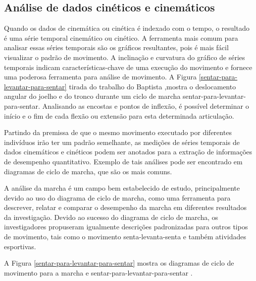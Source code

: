 \subsection{Análise de dados cinéticos e cinemáticos}
Quando os dados de cinemática ou cinética é indexado com o tempo, o resultado é uma série temporal cinemático
 ou cinético. A ferramenta mais comum para analisar essas séries temporais são os
gráficos resultantes, pois é mais fácil visualizar o padrão de movimento. A inclinação e
curvatura do gráfico de séries temporais indicam características-chave de uma
 execução do movimento e fornece uma poderosa ferramenta para análise de movimento.
A Figura \ref{sentar-para-levantar-para-sentar} tirada do trabalho do Baptista \cite{roberto},mostra o deslocamento angular do
joelho e do tronco durante um ciclo de marcha sentar-para-levantar-para-sentar. Analisando as encostas e pontos de inflexão, é
possível determinar o início e o fim de cada flexão ou extensão para esta determinada
articulação.

Partindo da premissa de que o mesmo movimento executado por diferentes indivíduos irão
ter um padrão semelhante, as medições de séries temporais de dados cinemáticos e
 cinéticos podem ser anotados para a extração de informações de
desempenho quantitativo. Exemplo de tais análises pode ser encontrado em diagramas de ciclo de marcha, que são os mais comuns.

A análise da marcha é um campo bem estabelecido de estudo, principalmente devido
ao uso do diagrama de ciclo de marcha, como uma ferramenta para descrever,
relatar e comparar o desempenho da marcha em diferentes resultados da investigação.
Devido ao sucesso do diagrama de ciclo de marcha, os investigadores propuseram igualmente descrições padronizadas para
outros tipos de movimento, tais como o movimento senta-levanta-senta e também atividades esportivas.

A Figura \ref{sentar-para-levantar-para-sentar} mostra os diagramas de ciclo de movimento para a marcha e sentar-para-levantar-para-sentar .

